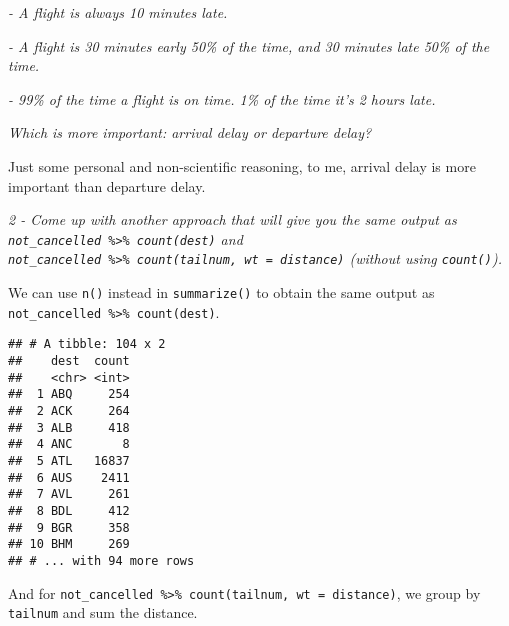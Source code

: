 \documentclass[]{article}
\newenvironment{Shaded}{\begin{snugshade}}{\end{snugshade}}
\newcommand{\KeywordTok}[1]{\textcolor[rgb]{0.13,0.29,0.53}{\textbf{#1}}}
\newcommand{\DataTypeTok}[1]{\textcolor[rgb]{0.13,0.29,0.53}{#1}}
\newcommand{\StringTok}[1]{\textcolor[rgb]{0.31,0.60,0.02}{#1}}
\newcommand{\OperatorTok}[1]{\textcolor[rgb]{0.81,0.36,0.00}{\textbf{#1}}}
\newcommand{\NormalTok}[1]{#1}
\theoremstyle{definition}
\theoremstyle{definition}
\theoremstyle{definition}
\theoremstyle{remark}
\begin{document}
\emph{- A flight is always 10 minutes late.}

\emph{- A flight is 30 minutes early 50\% of the time, and 30 minutes
late 50\% of the time.}

\emph{- 99\% of the time a flight is on time. 1\% of the time it's 2
hours late.}

\emph{Which is more important: arrival delay or departure delay?}

Just some personal and non-scientific reasoning, to me, arrival delay is
more important than departure delay.

\emph{2 - Come up with another approach that will give you the same
output as \texttt{not\_cancelled\ \%\textgreater{}\%\ count(dest)} and
\texttt{not\_cancelled\ \%\textgreater{}\%\ count(tailnum,\ wt\ =\ distance)}
(without using \texttt{count()}).}

We can use \texttt{n()} instead in \texttt{summarize()} to obtain the
same output as \texttt{not\_cancelled\ \%\textgreater{}\%\ count(dest)}.

\begin{Shaded}
\end{Shaded}

\begin{verbatim}
## # A tibble: 104 x 2
##    dest  count
##    <chr> <int>
##  1 ABQ     254
##  2 ACK     264
##  3 ALB     418
##  4 ANC       8
##  5 ATL   16837
##  6 AUS    2411
##  7 AVL     261
##  8 BDL     412
##  9 BGR     358
## 10 BHM     269
## # ... with 94 more rows
\end{verbatim}

And for
\texttt{not\_cancelled\ \%\textgreater{}\%\ count(tailnum,\ wt\ =\ distance)},
we group by \texttt{tailnum} and sum the distance.

\begin{Shaded}
\end{Shaded}
\end{document}
